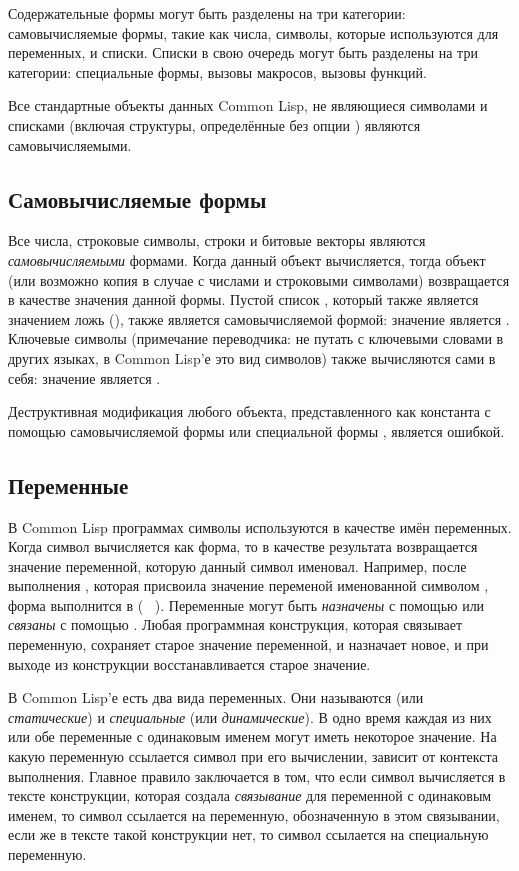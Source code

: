 Содержательные формы могут быть разделены на три категории:
самовычисляемые формы, такие как числа,
символы, которые используются для переменных,
и списки. Списки в свою очередь могут быть разделены на три категории:
специальные формы, 
вызовы макросов,
вызовы функций.

Все стандартные объекты данных Common Lisp, не являющиеся символами и списками
(включая  структуры, определённые без опции ) являются
самовычисляемыми. 

\subsection{Самовычисляемые формы}

Все числа, строковые символы, строки и битовые векторы являются
\emph{самовычисляемыми} формами.
Когда данный объект вычисляется, тогда объект (или возможно копия в случае с
числами и строковыми символами) возвращается в качестве значения данной
формы. Пустой список {\emptylist}, который также является значением ложь
({\false}), также является самовычисляемой формой: значение {\false} является
{\false}.
Ключевые символы (примечание переводчика: не путать с ключевыми словами в других
языках, в Common Lisp'е это вид символов) также вычисляются сами в себя:
значение  является .

Деструктивная модификация любого объекта, представленного как
константа с помощью самовычисляемой формы или специальной формы ,
является ошибкой.

\subsection{Переменные}

В Common Lisp программах символы используются в качестве имён переменных.
Когда символ вычисляется как форма, то в качестве результата возвращается
значение переменной, которую данный символ именовал. Например, после выполнения
, которая присвоила значение  переменой именованной
символом , форма  выполнится в  ( \EV\
).
Переменные могут быть \emph{назначены} с помощью  или \emph{связаны} с
помощью \cdf{let}.
Любая программная конструкция, которая связывает переменную, сохраняет старое
значение переменной, и назначает новое, и при выходе из конструкции
восстанавливается старое значение.

В Common Lisp'е есть два вида переменных. Они называются  (или
\emph{статические}) и \emph{специальные} (или \emph{динамические}).
В одно время каждая из них или обе переменные с одинаковым именем могут иметь
некоторое значение. На какую переменную ссылается символ при его вычислении,
зависит от контекста выполнения. Главное правило заключается в том, что если
символ вычисляется в тексте конструкции, которая создала \emph{связывание} для
переменной с одинаковым именем, то символ ссылается на переменную, обозначенную
в этом связывании, если же в тексте такой конструкции нет, то символ ссылается
на специальную переменную.

